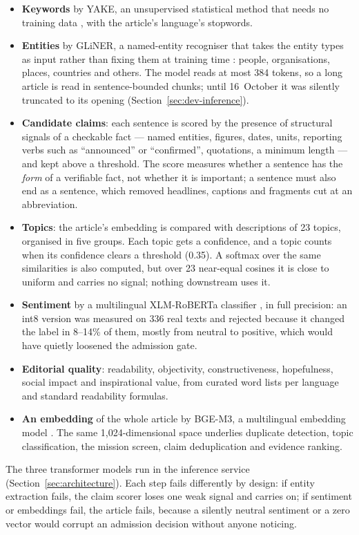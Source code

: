 \begin{itemize}
    \item \textbf{Keywords} by YAKE, an unsupervised statistical method
    that needs no training data \cite{campos2020yake}, with the
    article's language's stopwords.
    \item \textbf{Entities} by GLiNER, a named-entity recogniser that
    takes the entity types as input rather than fixing them at training
    time \cite{zaratiana2024gliner}: people, organisations, places,
    countries and others. The model reads at most 384 tokens, so a long
    article is read in sentence-bounded chunks; until 16~October it was
    silently truncated to its opening (Section~\ref{sec:dev-inference}).
    \item \textbf{Candidate claims}: each sentence is scored by the
    presence of structural signals of a checkable fact --- named
    entities, figures, dates, units, reporting verbs such as
    ``announced'' or ``confirmed'', quotations, a minimum length --- and
    kept above a threshold. The score measures whether a sentence has
    the \emph{form} of a verifiable fact, not whether it is important;
    a sentence must also end as a sentence, which removed headlines,
    captions and fragments cut at an abbreviation.
    \item \textbf{Topics}: the article's embedding is compared with
    descriptions of 23 topics, organised in five groups. Each topic gets
    a confidence, and a topic counts when its confidence clears a
    threshold (0.35). A softmax over the same similarities is also
    computed, but over 23 near-equal cosines it is close to uniform and
    carries no signal; nothing downstream uses it.
    \item \textbf{Sentiment} by a multilingual XLM-RoBERTa classifier
    \cite{barbieri2022xlmt}, in full precision: an int8 version was
    measured on 336 real texts and rejected because it changed the
    label in 8--14\% of them, mostly from neutral to positive, which
    would have quietly loosened the admission gate.
    \item \textbf{Editorial quality}: readability, objectivity,
    constructiveness, hopefulness, social impact and inspirational
    value, from curated word lists per language and standard
    readability formulas.
    \item \textbf{An embedding} of the whole article by BGE-M3, a
    multilingual embedding model \cite{chen2024bgem3}. The same
    1,024-dimensional space underlies duplicate detection, topic
    classification, the mission screen, claim deduplication and
    evidence ranking.
\end{itemize}

The three transformer models run in the inference service
(Section~\ref{sec:architecture}). Each step fails differently by
design: if entity extraction fails, the claim scorer loses one weak
signal and carries on; if sentiment or embeddings fail, the article
fails, because a silently neutral sentiment or a zero vector would
corrupt an admission decision without anyone noticing.

